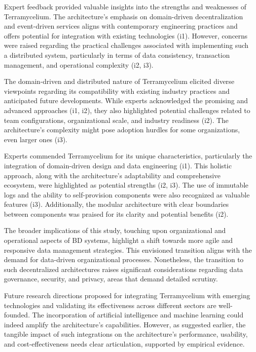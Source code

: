 \documentclass[review]{elsarticle}
\begin{document}
Expert feedback provided valuable insights into the strengths and weaknesses of Terramycelium. The architecture's emphasis on domain-driven decentralization and event-driven services aligns with contemporary engineering practices and offers potential for integration with existing technologies (i1). However, concerns were raised regarding the practical challenges associated with implementing such a distributed system, particularly in terms of data consistency, transaction management, and operational complexity (i2, i3).

The domain-driven and distributed nature of Terramycelium elicited diverse viewpoints regarding its compatibility with existing industry practices and anticipated future developments. While experts acknowledged the promising and advanced approaches (i1, i2), they also highlighted potential challenges related to team configurations, organizational scale, and industry readiness (i2). The architecture's complexity might pose adoption hurdles for some organizations, even larger ones (i3).

Experts commended Terramycelium for its unique characteristics, particularly the integration of domain-driven design and data engineering (i1). This holistic approach, along with the architecture's adaptability and comprehensive ecosystem, were highlighted as potential strengths (i2, i3). The use of immutable logs and the ability to self-provision components were also recognized as valuable features (i3). Additionally, the modular architecture with clear boundaries between components was praised for its clarity and potential benefits (i2).

The broader implications of this study, touching upon organizational and operational aspects of BD systems, highlight a shift towards more agile and responsive data management strategies. This envisioned transition aligns with the demand for data-driven organizational processes. Nonetheless, the transition to such decentralized architectures raises significant considerations regarding data governance, security, and privacy, areas that demand detailed scrutiny.

Future research directions proposed for integrating Terramycelium with emerging technologies and validating its effectiveness across different sectors are well-founded. The incorporation of artificial intelligence and machine learning could indeed amplify the architecture's capabilities. However, as suggested earlier, the tangible impact of such integrations on the architecture's performance, usability, and cost-effectiveness needs clear articulation, supported by empirical evidence.
\end{document}
